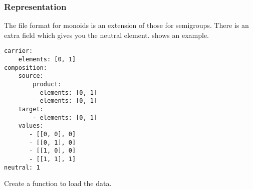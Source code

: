 





\subsubsection*{Representation}
%

The file format for monoids is an extension of those for semigroups.
There is an extra field  which gives you the neutral element.
 shows an example.

\begin{longcode}
    \caption{}
    \label{lst:monoid1}
    \begin{verbatim}
carrier:
    elements: [0, 1]
composition:
    source:
        product:
        - elements: [0, 1]
        - elements: [0, 1]
    target:
        - elements: [0, 1]
    values:
       - [[0, 0], 0]
       - [[0, 1], 0]
       - [[1, 0], 0]
       - [[1, 1], 1]
neutral: 1
    \end{verbatim}
\end{longcode}



\begin{codeexercise}
    Create a function to load the data.
%
\end{codeexercise}


